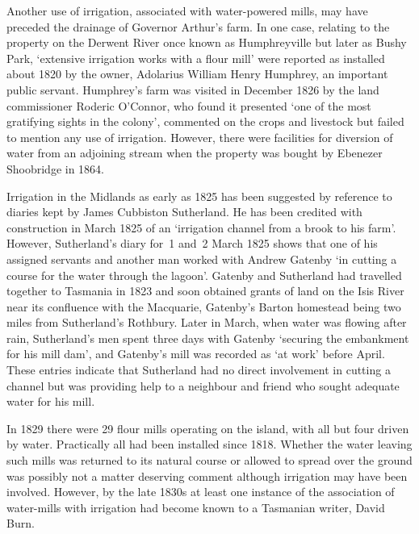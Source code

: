 Another use of irrigation, associated with water-powered mills, may
have preceded the drainage of Governor Arthur's farm.  In one case,
relating to the property on the Derwent River 
once known as Humphrey\-ville but later as Bushy Park, `extensive irrigation works with a flour mill' were
reported as installed about 1820 by the owner, Adolarius William Henry
Humphrey,  an important public servant.
Humphrey's farm was visited in December 1826 by the land commissioner
Roderic O'Connor, who found it presented `one of the most gratifying
sights in the colony', commented on the crops and livestock but failed
to mention any use of irrigation.  However, there were facilities for
diversion of water from an adjoining stream when the property was
bought by Ebenezer Shoobridge in
1864.

Irrigation in the Midlands as early as 1825 has
been suggested by reference to diaries kept by James Cubbiston
Sutherland. He has been credited with
construction in March 1825 of an `irrigation channel from a brook to
his farm'. However, Sutherland's diary for~1 and~2 March 1825 shows
that one of his assigned servants and another man worked with Andrew
Gatenby `in cutting a course for the water through
the lagoon'.  Gatenby and Sutherland had travelled together to
Tasmania in 1823 and soon obtained grants of land on the Isis
River near its confluence with the
Macquarie, Gatenby's Barton homestead being two
miles from Sutherland's Rothbury.  Later in March, when water was
flowing after rain, Sutherland's men spent three days with Gatenby
`securing the embankment for his mill dam', and Gatenby's mill was
recorded as `at work' before April.  These entries indicate that
Sutherland had no direct involvement in cutting a channel but was
providing help to a neighbour and friend who sought adequate water for
his mill.

In 1829 there were 29 flour mills operating on the island, with all
but four driven by water.  Practically all had been installed since
1818.  Whether the water leaving such mills was returned to its
natural course or allowed to spread over the ground was possibly not a
matter deserving comment although irrigation may have been
involved. However, by the late 1830s at least one instance of the
association of water-mills with irrigation had become known to a
Tasmanian writer, David Burn.

